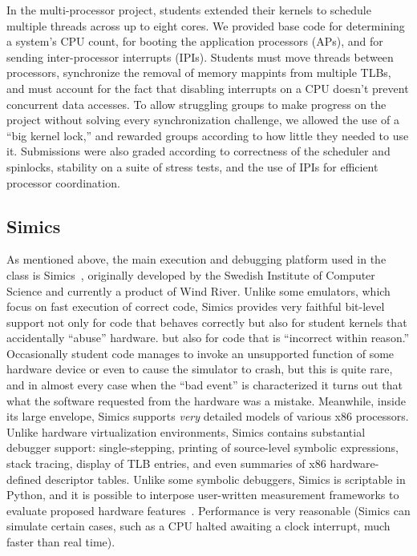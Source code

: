 In the multi-processor project, students extended their kernels to schedule multiple threads across up to eight cores.
We provided base code for determining a system's CPU count, for booting the application processors (APs), and for sending inter-processor interrupts (IPIs).
Students must move threads between processors,
synchronize the removal of memory mappints from multiple TLBs,
and must account for the fact that disabling interrupts on a CPU doesn't prevent concurrent data accesses.
To allow struggling groups to make progress on the project without solving every synchronization challenge, we allowed the use of a ``big kernel lock,'' and rewarded groups according to how little they needed to use it.
Submissions were also graded according to
correctness of the scheduler and spinlocks,
stability on a suite of stress tests,
and the use of IPIs for efficient processor coordination.

\subsection{Simics}

As mentioned above, the main execution and debugging
platform used in the class is
Simics~\cite{simics},
originally developed by the Swedish Institute of
Computer Science and
currently a product of Wind River.
Unlike some emulators,
which focus on fast execution of correct code,
Simics
provides very faithful bit-level support
not only for code that behaves correctly
\shortversion
{but also for student kernels that accidentally ``abuse'' hardware.}
{but also for code that is ``incorrect within reason.''
Occasionally student code manages to invoke an unsupported
function of some hardware device or even to cause the
simulator to crash, but this is quite rare, and in almost
every case when the ``bad event'' is characterized it turns
out that what the software requested from the hardware was
a mistake.
Meanwhile, inside its large envelope, Simics supports
\textit{very} detailed models of various x86 processors.}
Unlike hardware virtualization environments,
Simics contains substantial debugger support:
single-stepping,
printing of source-level symbolic
expressions,
stack tracing,
display of TLB entries,
and even summaries of x86 hardware-defined descriptor tables.
Unlike some symbolic debuggers,
Simics is scriptable in Python,
and it is possible to interpose user-written measurement
frameworks to evaluate proposed hardware
features~.
Performance is very reasonable (Simics can simulate certain
cases, such as a CPU halted awaiting a clock interrupt,
much faster than real time).

